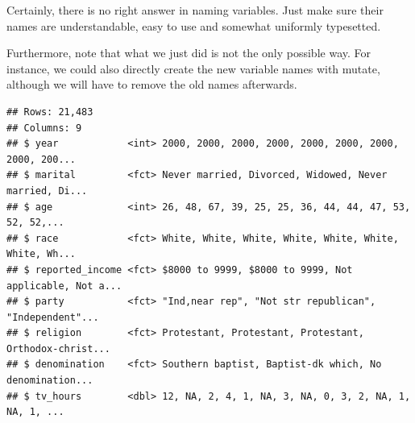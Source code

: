 \documentclass[]{tufte-book}
\newenvironment{Shaded}{}{}
\newcommand{\DataTypeTok}[1]{\textcolor[rgb]{0.56,0.13,0.00}{#1}}
\newcommand{\KeywordTok}[1]{\textcolor[rgb]{0.00,0.44,0.13}{\textbf{#1}}}
\newcommand{\NormalTok}[1]{#1}
\newcommand{\OperatorTok}[1]{\textcolor[rgb]{0.40,0.40,0.40}{#1}}
\newcommand{\StringTok}[1]{\textcolor[rgb]{0.25,0.44,0.63}{#1}}
\begin{document}
Certainly, there is no right answer in naming variables. Just make sure their names are understandable, easy to use and somewhat uniformly typesetted.

Furthermore, note that what we just did is not the only possible way. For instance, we could also directly create the new variable names with mutate, although we will have to remove the old names afterwards.

\begin{Shaded}
\end{Shaded}

\begin{verbatim}
## Rows: 21,483
## Columns: 9
## $ year            <int> 2000, 2000, 2000, 2000, 2000, 2000, 2000, 2000, 200...
## $ marital         <fct> Never married, Divorced, Widowed, Never married, Di...
## $ age             <int> 26, 48, 67, 39, 25, 25, 36, 44, 44, 47, 53, 52, 52,...
## $ race            <fct> White, White, White, White, White, White, White, Wh...
## $ reported_income <fct> $8000 to 9999, $8000 to 9999, Not applicable, Not a...
## $ party           <fct> "Ind,near rep", "Not str republican", "Independent"...
## $ religion        <fct> Protestant, Protestant, Protestant, Orthodox-christ...
## $ denomination    <fct> Southern baptist, Baptist-dk which, No denomination...
## $ tv_hours        <dbl> 12, NA, 2, 4, 1, NA, 3, NA, 0, 3, 2, NA, 1, NA, 1, ...
\end{verbatim}
\end{document}
